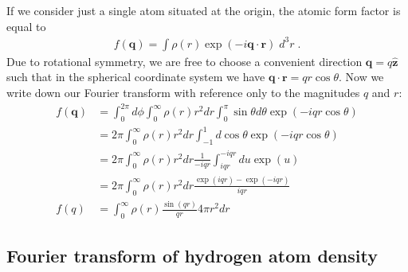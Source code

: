\documentclass[11pt]{article}
\renewcommand{\vec}[1]{\boldsymbol{#1}}
\newcommand{\hvec}[1]{\hat{\vec{#1}}}
\begin{document}
If we consider just a single atom situated at the origin, the atomic form factor is equal to
\begin{align}
 f(\vec{q})  = \int \rho(r) \exp(-i \vec{q}\cdot\vec{r}) \; d^3r \; .
\end{align}
Due to rotational symmetry, we are free to choose a convenient direction $\vec{q} = q \hvec{z}$ such that in the
spherical coordinate system we have $\vec{q}\cdot\vec{r} =  q r \cos\theta$.  Now we write down our Fourier transform with
reference only to the magnitudes $q$ and $r$:
\begin{align}
f(\vec{q})  &= \int_0^{2\pi} d\phi \int_0^\infty \rho(r) r^2 dr \int_0^\pi \sin\theta d\theta  \exp(-i q r \cos\theta)\\
&=2\pi \int_0^\infty \rho(r) r^2 dr \int_{-1}^1  d\cos\theta  \exp(-i q r \cos\theta)  \\
&=2\pi \int_0^\infty \rho(r) r^2 dr \frac{1}{-iqr}\int_{iqr}^{-iqr}  du  \exp(u)  \\
&=2\pi \int_0^\infty \rho(r) r^2 dr \frac{\exp(iqr) - \exp(-iqr)}{iqr}   \\
f(q) &= \int_0^\infty \rho(r)   \frac{\sin(qr)}{qr}  4\pi r^2 dr  
\end{align}

\subsection{Fourier transform of hydrogen atom density}
\label{sec:hydrogenft}
\end{document}
